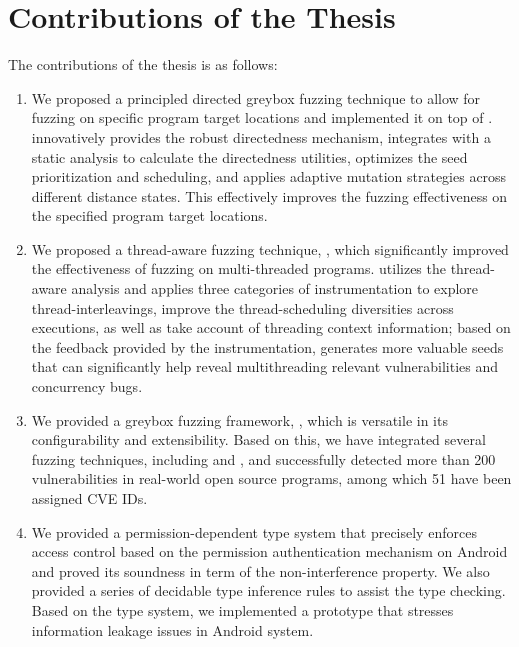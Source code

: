 \section{Contributions of the Thesis}
The contributions of the thesis is as follows:
\begin{enumerate}
	\item We proposed a principled directed greybox fuzzing technique \dFOT to allow for fuzzing on specific program target locations and implemented it on top of \FOT. \dFOT innovatively provides the robust directedness mechanism, integrates with a static analysis to calculate the directedness utilities, optimizes the seed prioritization and scheduling, and applies adaptive mutation strategies across different distance states. This effectively improves the fuzzing effectiveness on the specified program target locations.
	\item We proposed a thread-aware fuzzing technique, \mtfuzz, which significantly improved the effectiveness of fuzzing on multi-threaded programs. \mtfuzz utilizes the thread-aware analysis and applies three categories of instrumentation to explore thread-interleavings,  improve the thread-scheduling diversities across executions, as well as take account of threading context information; based on the feedback provided by the instrumentation, \mtfuzz generates more valuable seeds that can significantly help reveal multithreading relevant vulnerabilities and concurrency bugs.
	\item We provided a greybox fuzzing framework, \FOT, which is versatile in its configurability and extensibility. Based on this, we have integrated several fuzzing techniques, including \dFOT and \mtfuzz, and successfully detected more than 200 vulnerabilities in real-world open source programs, among which 51 have been assigned CVE IDs.
	\item We provided a permission-dependent type system that precisely enforces access control based on the permission authentication mechanism on Android and proved its soundness in term of the non-interference property. We also provided a series of decidable type inference rules to assist the type checking. Based on the type system, we implemented a prototype that stresses information leakage issues in Android system.
\end{enumerate}


